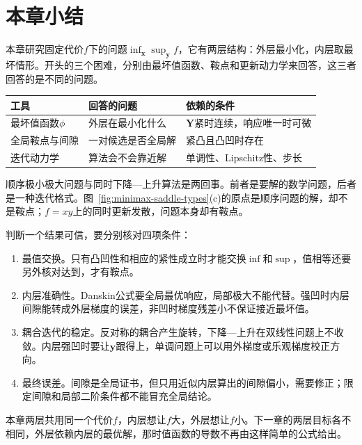 \section{本章小结}
\label{sec:minimax-summary}

本章研究固定代价$f$下的问题$\inf_{\bm{x}}\sup_{\bm{y}}f$，它有两层结构：外层最小化，内层取最坏情形。开头的三个困难，分别由最坏值函数、鞍点和更新动力学来回答，这三者回答的是不同的问题。

\begin{BookInlineTable}
 \centering
 \begin{tabular}{@{}lll@{}}
  \toprule
  工具 & 回答的问题 & 依赖的条件\\
  \midrule
  最坏值函数$\phi$ & 外层在最小化什么 & $\bm{Y}$紧时连续，响应唯一时可微\\
  全局鞍点与间隙 & 一对候选是否全局解 & 紧凸且凸凹时存在\\
  迭代动力学 & 算法会不会靠近解 & 单调性、Lipschitz性、步长\\
  \bottomrule
 \end{tabular}
 \caption{本章的三个主要工具。}
 \label{tab:minimax-summary}
\end{BookInlineTable}

顺序极小极大问题与同时下降—上升算法是两回事。前者是要解的数学问题，后者是一种迭代格式。图~\ref{fig:minimax-saddle-types}(c)的原点是顺序问题的解，却不是鞍点；$f=xy$上的同时更新发散，问题本身却有鞍点。

判断一个结果可信，要分别核对四项条件：
\begin{enumerate}
 \item 最值交换。只有凸凹性和相应的紧性成立时才能交换$\inf$和$\sup$，值相等还要另外核对达到，才有鞍点。
 \item 内层准确性。Danskin公式要全局最优响应，局部极大不能代替。强凹时内层间隙能转成外层梯度的误差，非凹时梯度残差小不保证接近最坏值。
 \item 耦合迭代的稳定。反对称的耦合产生旋转，下降—上升在双线性问题上不收敛。内层强凹时要让$\bm{y}$跟得上，单调问题上可以用外梯度或乐观梯度校正方向。
 \item 最终误差。间隙是全局证书，但只用近似内层算出的间隙偏小，需要修正；限定间隙和局部二阶条件都不能冒充全局结论。
\end{enumerate}

本章两层共用同一个代价$f$，内层想让$f$大，外层想让$f$小。下一章的两层目标各不相同，外层依赖内层的最优解，那时值函数的导数不再由这样简单的公式给出。

